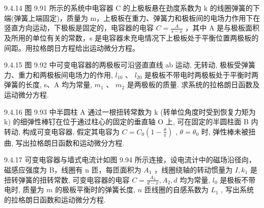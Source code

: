 \begin{problem}{9.4.14}
图 9.91 所示的系统中电容器 C 的上极板悬在劲度系数为 k 的线圈弹簧的下端(弹簧上端固定)，质量为 m，上极板在重力、弹簧力和极板间的电场力作用下在竖直方向运动，下极板是固定的，电容器的电容 $C=\frac{A}{s-x}$ ，其中 A 是与极板面积及所用的单位有关的常数，s 是电容器未充电情况下上极板处于平衡位置两极板的间距。用拉格朗日方程给出运动微分方程。
\begin{center}

\end{center}
\end{problem}
\clearpage


\begin{problem}{9.4.15}
图 9.92 中可变电容器的两极板可沿竖直直线 ab 运动, 无转动, 极板受弹簧力、重力和两极板间电场力的作用, $l_{10}$ 、 $l_{20}$ 是极板不带电时两极板处于平衡时两弹簧的长度, s、A 均为常量, $m_{1}$ 、 $m_{2}$ 是两极板的质量. 求系统的拉格朗日函数及运动微分方程.
\begin{center}

\end{center}
\end{problem}
\clearpage


\begin{problem}{9.4.16}
图 9.93 中半圆柱 A 通过一根扭转常数为 k (转单位角度时受到恢复力矩为 k) 的细弹性棒钉在位于通过柱心的固定的垂直轴 O 上, 可在固定的半圆柱面 B 内转动, 构成可变电容器, 假定其电容为 $C = C_{0} \left(1 - \frac{\theta}{\pi}\right)$ , $\theta = \theta_{0}$ 时, 弹性棒未被扭曲, 写出拉格朗日函数和运动微分方程.
\begin{center}

\end{center}
\end{problem}
\clearpage


\begin{problem}{9.4.17}
可变电容器与墙式电流计如图 9.94 所示连接，设电流计中的磁场沿径向，磁感应强度为 B，线圈有 n 匝，每匝面积为 $A_{1}$ ，线圈绕轴的转动惯量为 $I, k_{1}$ 是扭转弹簧的扭转常数, 可变电容器的电容 $C = \frac{A_2}{d - x}, A_2, d$ 均为常量, $l_0$ 是极板不带电时, 质量为 $m$ 的极板平衡时的弹簧长度, $n$ 匝线圈的自感系数为 $L_1$ , 写出系统的拉格朗日函数和运动微分方程.
\begin{center}

\end{center}
\end{problem}
\clearpage


